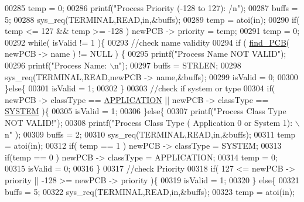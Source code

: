 \begin{DoxyCode}
00285         temp = 0;
00286         printf(\textcolor{stringliteral}{"Process Priority (-128 to 127): /n"});
00287         buffs = 5;
00288         sys\_req(TERMINAL,READ,in,&buffs);
00289         temp = atoi(in);
00290         \textcolor{keywordflow}{if}( temp <= 127 && temp >= -128 ) newPCB -> priority = temp;
00291         temp = 0;
00292         \textcolor{keywordflow}{while}( isValid !=  1 )\{
00293                 \textcolor{comment}{//check name validity}
00294                 \textcolor{keywordflow}{if} ( \hyperlink{mpx__r2_8c_a612a6abcb66c688a32f33abc93ff3990}{find_PCB}( newPCB -> name ) != NULL ) \{
00295                         printf(\textcolor{stringliteral}{"Process Name NOT VALID"});
00296                         printf(\textcolor{stringliteral}{"Process Name: \(\backslash\)n"});
00297                         buffs = STRLEN;
00298                         sys\_req(TERMINAL,READ,newPCB -> name,&buffs);
00299                         isValid = 0;
00300                 \}\textcolor{keywordflow}{else}\{
00301                         isValid = 1;
00302                 \}
00303                 \textcolor{comment}{//check if system or type}
00304                 \textcolor{keywordflow}{if}( newPCB -> classType == \hyperlink{mpx__r2_8h_a796bd7c6ba2e59281760fb155c6287e8}{APPLICATION} || newPCB -> classType == 
      \hyperlink{mpx__r2_8h_a21b97df85e65556468b28a576311271c}{SYSTEM} )\{
00305                         isValid = 1;
00306                 \}\textcolor{keywordflow}{else}\{
00307                         printf(\textcolor{stringliteral}{"Process Class Type NOT VALID!"});
00308                         printf(\textcolor{stringliteral}{"Process Class Type ( Application 0 or System  1):
       \(\backslash\)n"} );
00309                         buffs = 2;
00310                         sys\_req(TERMINAL,READ,in,&buffs);
00311                         temp = atoi(in);
00312                         \textcolor{keywordflow}{if}( temp == 1 ) newPCB -> classType = SYSTEM;
00313                         \textcolor{keywordflow}{if}(temp == 0 ) newPCB -> classType = APPLICATION;
00314                         temp = 0;
00315                         isValid = 0;
00316                 \}
00317                 \textcolor{comment}{//check Priority}
00318                 \textcolor{keywordflow}{if}( 127 <= newPCB -> priority || -128 >= newPCB -> priority )\{
00319                     isValid = 1;
00320                 \} \textcolor{keywordflow}{else}\{
00321                         buffs = 5;
00322                         sys\_req(TERMINAL,READ,in,&buffs);
00323                         temp = atoi(in);

\end{DoxyCode}
